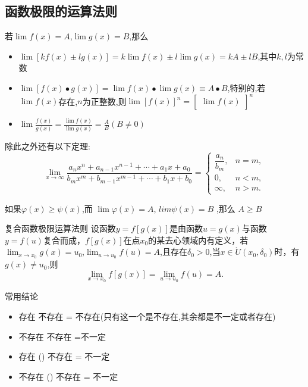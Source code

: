 \documentclass[12pt, a4paper, oneside, UTF8]{ctexbook}  %
\begin{document}
\subsection{函数极限的运算法则}
若$\lim f(x)=A$,$\lim g(x)=B$,那么
\begin{itemize}
    \item $\operatorname*{lim}[kf(x)\pm lg(x)]=k\operatorname*{lim}f(x)\pm l\operatorname*{lim}g(x)=kA\pm lB$,其中$k,l$为常数
    \item $\operatorname*{lim}[f(x)\bullet g(x)]=\operatorname*{lim}f(x)\bullet\operatorname*{lim}g(x)\equiv A\bullet B$,特别的,若$\lim f(x)$存在,$n$为正整数,则$\operatorname{lim}[f(x)]^n=\begin{bmatrix}\operatorname{lim}f(x)\end{bmatrix}^n$
    \item $\operatorname*{lim}\frac{f(x)}{g(x)}=\frac{\operatorname*{lim}f(x)}{\operatorname*{lim}g(x)}=\frac{A}{B}(B\neq0)$
\end{itemize}
除此之外还有以下定理:
$$
    \lim_{x\to\infty}\frac{a_nx^n+a_{n-1}x^{n-1}+\cdots+a_{1}x+a_0}{b_mx^m+b_{m-1}x^{m-1}+\cdots+b_1x+b_0}=\begin{cases}\dfrac{a_n}{b_m},&n=m,\\[2ex]0,&n<m,\\[2ex]\infty,&n>m.\end{cases}
$$
\begin{them}{}{}
    如果$\varphi(x)\geqslant\psi(x)$,而 $\lim\varphi(x)=A$, $lim \psi(x)=B$ ,那么 $A\geqslant B$
\end{them}
\begin{them}{复合函数极限运算法则}{}
    设函数$y=f[g(x)]$是由函数$u=g(x)$与函数$y=f(u)$复合而成，$f[g(x)]$在点$x_0$的某去心领域内有定义，若$\lim_{x \to  x_0} g(x)=u_0$,$\lim_{u \to u_0}f(u)=A$,且存在$\delta_0 >0$,当$x\in\mathring{U}\left(x_{0},\delta_{0}\right)$时，有$g\left(x\right)\neq u_{0}$,则
    $$
        \underset{x\to x_0}{\operatorname*{lim}}f[g(x)]=\underset{u\to u_0}{\operatorname*{lim}}f(u)=A.
    $$
\end{them}
\begin{criterion}{常用结论}{}
    \begin{itemize}
        \item 存在 \pm 不存在 = 不存在(只有这一个是不存在,其余都是不一定或者存在)
        \item 不存在 \pm 不存在 =不一定
        \item 存在 \times (\div) 不存在 = 不一定
        \item 不存在 \times (\div) 不存在 = 不一定
    \end{itemize}
\end{criterion}
\end{document}
